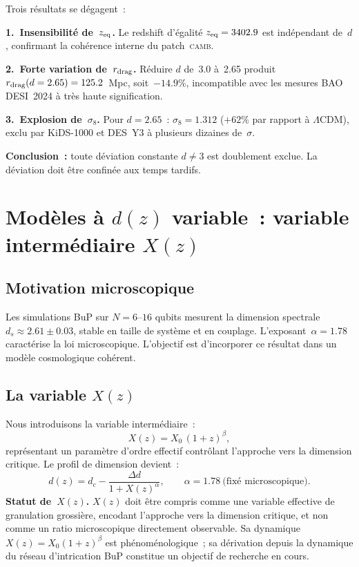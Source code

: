 \documentclass[a4paper,11pt]{article}
\newcommand{\DC}{d_c}
\newcommand{\rdrag}{r_{\rm drag}}
\newcommand{\sig}{\sigma_8}
\newcommand{\LCDM}{\Lambda\mathrm{CDM}}
\newcommand{\camb}{\textsc{camb}}
\begin{document}
Trois résultats se dégagent~:

\textbf{1.~Insensibilité de~$z_{\rm eq}$.} Le redshift d'égalité
$z_{\rm eq}=3402.9$ est indépendant de~$d$, confirmant la cohérence
interne du patch~\camb.

\textbf{2.~Forte variation de~$\rdrag$.} Réduire $d$ de~3.0
à~2.65 produit $\rdrag(d=2.65)=125.2$~Mpc, soit~$-14.9\%$,
incompatible avec les mesures BAO DESI~2024 à très haute
signification.

\textbf{3.~Explosion de~$\sig$.} Pour $d=2.65$~:
$\sig=1.312$ ($+62\%$ par rapport à $\LCDM$), exclu par
KiDS-1000 et DES~Y3 à plusieurs dizaines de~$\sigma$.

\textbf{Conclusion~:} toute déviation constante $d\neq 3$ est
doublement exclue. La déviation doit être confinée aux temps tardifs.

\section{Modèles à $d(z)$ variable~: variable intermédiaire $X(z)$}
\label{sec:models}

\subsection{Motivation microscopique}

Les simulations BuP sur $N=6$--$16$ qubits mesurent la dimension
spectrale $d_s\approx 2.61\pm 0.03$, stable en taille de système
et en couplage. L'exposant~$\alpha=1.78$ caractérise la loi
microscopique. L'objectif est d'incorporer ce résultat dans un
modèle cosmologique cohérent.

\subsection{La variable $X(z)$}

Nous introduisons la variable intermédiaire~:
\begin{equation}
  X(z) = X_0\,(1+z)^\beta,
  \label{eq:X}
\end{equation}
représentant un paramètre d'ordre effectif contrôlant l'approche
vers la dimension critique. Le profil de dimension devient~:
\begin{equation}
  d(z) = \DC - \frac{\Delta d}{1 + X(z)^\alpha},
  \qquad \alpha = 1.78 \ \text{(fixé microscopique)}.
  \label{eq:dz}
\end{equation}
\textbf{Statut de~$X(z)$.}
$X(z)$ doit être compris comme une variable effective de granulation grossière,
encodant l'approche vers la dimension critique, et non comme un ratio
microscopique directement observable. Sa dynamique $X(z)=X_0(1+z)^\beta$
est phénoménologique~; sa dérivation depuis la dynamique du réseau d'intrication
BuP constitue un objectif de recherche en cours.
\end{document}
